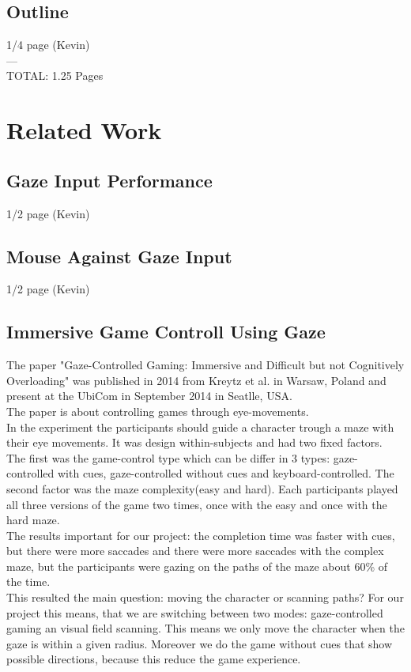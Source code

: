 \documentclass{sigchi}
\begin{document}
\subsection{Outline}
1/4 page (Kevin)\\
---\\
TOTAL: 1.25 Pages

\section{Related Work}
\subsection{Gaze Input Performance}
1/2 page (Kevin)
\subsection{Mouse Against Gaze Input}
1/2 page (Kevin)
\subsection{Immersive Game Controll Using Gaze}
The paper "Gaze-Controlled Gaming: Immersive and Difficult but not Cognitively Overloading" was published in 2014 from Kreytz et al. in Warsaw, Poland and present at the UbiCom in September 2014 in Seatlle, USA.\\
The paper is about controlling games through eye-movements.\\
In the experiment the participants should guide a character trough a maze with their eye movements. It was design within-subjects and had two fixed factors. The first was the game-control type which can be differ in 3 types: gaze-controlled with cues, gaze-controlled without cues and keyboard-controlled. The second factor was the maze complexity(easy and hard). Each participants played all three versions of the game two times, once with the easy and once with the hard maze.\\
The results important for our project: the completion time was faster with cues, but there were more saccades and there were more saccades with the complex maze, but the participants were gazing on the paths of the maze about 60\% of the time.\\
This resulted the main question: moving the character or scanning paths? For our project this means, that we are switching between two modes: gaze-controlled gaming an visual field scanning. This means we only move the character when the gaze is within a given radius. Moreover we do the game without cues that show possible directions, because this reduce the game experience. 
\end{document}
